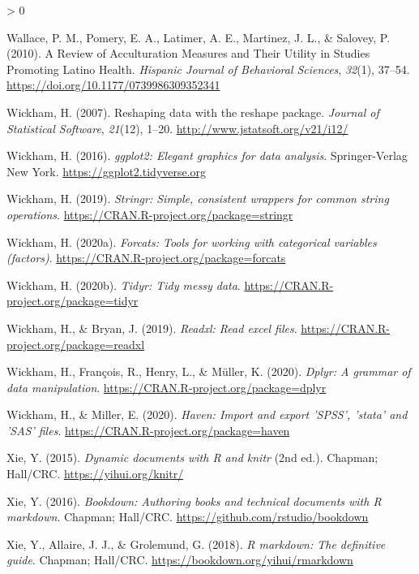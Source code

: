 \documentclass[
  american,
  man]{apa7}
\newlength{\cslhangindent}
\newenvironment{CSLReferences}[2] %
 {%
  \setlength{\parindent}{0pt}
  \ifodd #1 \everypar{\setlength{\hangindent}{\cslhangindent}}\ignorespaces\fi
  \ifnum #2 > 0
  \setlength{\parskip}{#2\baselineskip}
  \fi
 }%
 {}
\begin{document}
\begin{CSLReferences}{1}{0}
\leavevmode\hypertarget{ref-Wallace2010}{}%
Wallace, P. M., Pomery, E. A., Latimer, A. E., Martinez, J. L., \& Salovey, P. (2010). {A Review of Acculturation Measures and Their Utility in Studies Promoting Latino Health.} \emph{Hispanic Journal of Behavioral Sciences}, \emph{32}(1), 37--54. \url{https://doi.org/10.1177/0739986309352341}

\leavevmode\hypertarget{ref-R-reshape2}{}%
Wickham, H. (2007). Reshaping data with the {reshape} package. \emph{Journal of Statistical Software}, \emph{21}(12), 1--20. \url{http://www.jstatsoft.org/v21/i12/}

\leavevmode\hypertarget{ref-R-ggplot2}{}%
Wickham, H. (2016). \emph{ggplot2: Elegant graphics for data analysis}. Springer-Verlag New York. \url{https://ggplot2.tidyverse.org}

\leavevmode\hypertarget{ref-R-stringr}{}%
Wickham, H. (2019). \emph{Stringr: Simple, consistent wrappers for common string operations}. \url{https://CRAN.R-project.org/package=stringr}

\leavevmode\hypertarget{ref-R-forcats}{}%
Wickham, H. (2020a). \emph{Forcats: Tools for working with categorical variables (factors)}. \url{https://CRAN.R-project.org/package=forcats}

\leavevmode\hypertarget{ref-R-tidyr}{}%
Wickham, H. (2020b). \emph{Tidyr: Tidy messy data}. \url{https://CRAN.R-project.org/package=tidyr}

\leavevmode\hypertarget{ref-R-readxl}{}%
Wickham, H., \& Bryan, J. (2019). \emph{Readxl: Read excel files}. \url{https://CRAN.R-project.org/package=readxl}

\leavevmode\hypertarget{ref-R-dplyr}{}%
Wickham, H., François, R., Henry, L., \& Müller, K. (2020). \emph{Dplyr: A grammar of data manipulation}. \url{https://CRAN.R-project.org/package=dplyr}

\leavevmode\hypertarget{ref-R-haven}{}%
Wickham, H., \& Miller, E. (2020). \emph{Haven: Import and export 'SPSS', 'stata' and 'SAS' files}. \url{https://CRAN.R-project.org/package=haven}

\leavevmode\hypertarget{ref-R-knitr}{}%
Xie, Y. (2015). \emph{Dynamic documents with {R} and knitr} (2nd ed.). Chapman; Hall/CRC. \url{https://yihui.org/knitr/}

\leavevmode\hypertarget{ref-R-bookdown}{}%
Xie, Y. (2016). \emph{Bookdown: Authoring books and technical documents with {R} markdown}. Chapman; Hall/CRC. \url{https://github.com/rstudio/bookdown}

\leavevmode\hypertarget{ref-R-rmarkdown_a}{}%
Xie, Y., Allaire, J. J., \& Grolemund, G. (2018). \emph{R markdown: The definitive guide}. Chapman; Hall/CRC. \url{https://bookdown.org/yihui/rmarkdown}


\end{CSLReferences}
\end{document}
